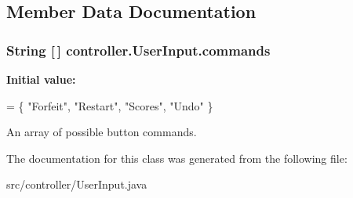 \subsection{Member Data Documentation}
\hypertarget{classcontroller_1_1_user_input_ad5bc549a7fc015878009b793ea479871}{
\subsubsection[{commands}]{\setlength{\rightskip}{0pt plus 5cm}String \mbox{[}$\,$\mbox{]} controller.\-User\-Input.\-commands\hspace{0.3cm}{\ttfamily [static]}}}\label{classcontroller_1_1_user_input_ad5bc549a7fc015878009b793ea479871}
{\bfseries Initial value\-:}
\begin{DoxyCode}
= \{ \textcolor{stringliteral}{"Forfeit"}, 
                                        \textcolor{stringliteral}{"Restart"},
                                        \textcolor{stringliteral}{"Scores"}, 
                                        \textcolor{stringliteral}{"Undo"}    \}
\end{DoxyCode}
An array of possible button commands. 

The documentation for this class was generated from the following file\-:\begin{DoxyCompactItemize}
\item 
src/controller/User\-Input.\-java\end{DoxyCompactItemize}
